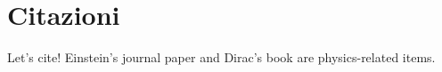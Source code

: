 \documentclass[../main.tex]{subfiles}
\begin{document}
\chapter{Citazioni}
\label{chap:tutorial8}

Let's cite! Einstein's journal paper \cite{einstein} and Dirac's
book \cite{dirac} are physics-related items.
\end{document}
